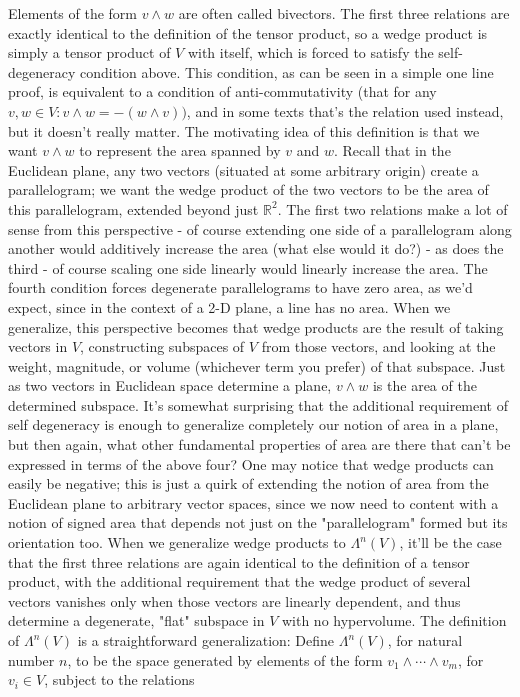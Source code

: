 \documentclass{article}
\newcommand{\nn}{\leavevmode \newline \newline}
\newcommand{\R}{\mathbb{R}}
\begin{document}
\begin{adjustwidth}{1cm}{1cm}
    Elements of the form $ v \wedge w $ are often called bivectors. The first three relations are exactly identical to the definition of the tensor product, so a wedge product is simply a tensor product of $ V $ with itself, which is forced to satisfy the self-degeneracy condition above. This condition, as can be seen in a simple one line proof, is equivalent to a condition of anti-commutativity (that for any $ v, w \in V: v \wedge w = - (w \wedge v)) $, and in some texts that's the relation used instead, but it doesn't really matter. The motivating idea of this definition is that we want $ v \wedge w $ to represent the area spanned by $ v $ and $ w $. Recall that in the Euclidean plane, any two vectors (situated at some arbitrary origin) create a parallelogram; we want the wedge product of the two vectors to be the area of this parallelogram, extended beyond just $ \R^2 $. The first two relations make a lot of sense from this perspective - of course extending one side of a parallelogram along another would additively increase the area (what else would it do?) - as does the third - of course scaling one side linearly would linearly increase the area. The fourth condition forces degenerate parallelograms to have zero area, as we'd expect, since in the context of a 2-D plane, a line has no area. When we generalize, this perspective becomes that wedge products are the result of taking vectors in $ V $, constructing subspaces of $ V $ from those vectors, and looking at the weight, magnitude, or volume (whichever term you prefer) of that subspace. Just as two vectors in Euclidean space determine a plane, $ v \wedge w $ is the area of the determined subspace. It's somewhat surprising that the additional requirement of self degeneracy is enough to generalize completely our notion of area in a plane, but then again, what other fundamental properties of area are there that can't be expressed in terms of the above four?
    \nn
    One may notice that wedge products can easily be negative; this is just a quirk of extending the notion of area from the Euclidean plane to arbitrary vector spaces, since we now need to content with a notion of signed area that depends not just on the "parallelogram" formed but its orientation too. When we generalize wedge products to $ \Lambda^n(V) $, it'll be the case that the first three relations are again identical to the definition of a tensor product, with the additional requirement that the wedge product of several vectors vanishes only when those vectors are linearly dependent, and thus determine a degenerate, "flat" subspace in $ V $ with no hypervolume. The definition of $ \Lambda^n(V) $ is a straightforward generalization:
    \nn
    Define $ \Lambda^n(V) $, for natural number $ n $, to be the space generated by elements of the form $ v_1 \wedge \cdots \wedge v_m $, for $ v_i \in V $, subject to the relations


\end{adjustwidth}
\end{document}
